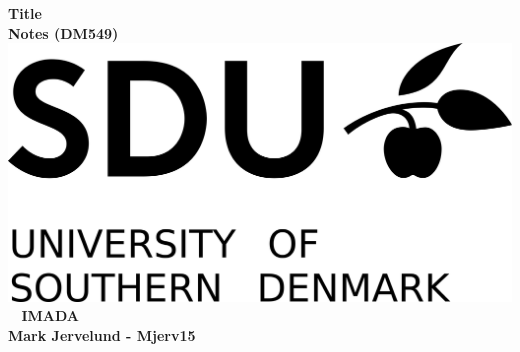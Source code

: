 \documentclass[a4paper,10pt,titlepage]{report}
\date{}
\begin{document}
\begin{titlepage}
\centering
    \vspace*{9\baselineskip}
    \huge
    \bfseries
    Title \\
    
    \normalfont 
	\huge    
    Notes (DM549)  \\[4\baselineskip]
    \normalfont
	\includegraphics[scale=1.5]{SDU_Logo}
    \vfill\ 
    \vspace{5mm}
    IMADA \\
    \vspace{5mm} 
    Mark Jervelund - Mjerv15
    \\
    \textbf{\datedate}  \bf{} \\[2\baselineskip]
\end{titlepage}


\setcounter{page}{1}
\renewcommand{\thepage}{\arabic{page}}
\end{document}
